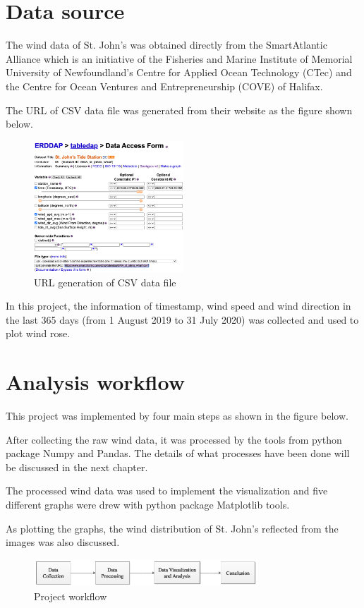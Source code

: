 \documentclass[10pt]{report}
\begin{document}

\section{Data source}
The wind data of St. John's was obtained directly from the SmartAtlantic Alliance which is an initiative of the Fisheries and Marine Institute of Memorial University of Newfoundland's Centre for Applied Ocean Technology (CTec) and the Centre for Ocean Ventures and Entrepreneurship (COVE) of Halifax.\par
The URL of CSV data file was generated from their website as the figure shown below. \par

\begin{figure}[h!]
    \centering
    \includegraphics[width=0.50\textwidth]{images/data_source.png}
    \caption{URL generation of CSV data file}
    \label{fig: PaleBlueDot}    
\end{figure}

In this project, the information of timestamp, wind speed and wind direction in the last 365 days (from 1 August 2019 to 31 July 2020) was collected and used to plot wind rose.\par

\section{Analysis workflow}
This project was implemented by four main steps as shown in the figure below.\par
After collecting the raw wind data, it was processed by the tools from python package Numpy and Pandas. The details of what processes have been done will be discussed in the next chapter.\par
The processed wind data was used to implement the visualization and five different graphs were drew with python package Matplotlib tools.\par
As plotting the graphs, the wind distribution of St. John's reflected from the images was also discussed.
\begin{figure}[h!]
    \centering
    \includegraphics[width=0.75\textwidth]{images/workflow.png}
    \caption{Project workflow}
    \label{fig: PaleBlueDot}    
\end{figure}
\end{document}
